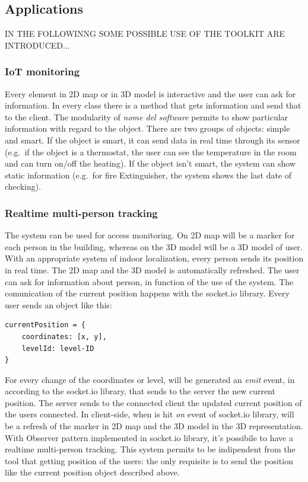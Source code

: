 \documentclass{sig-alternate}
\begin{document}
\subsection{Applications}\label{applications}

IN THE FOLLOWINNG SOME POSSIBLE USE OF THE TOOLKIT ARE INTRODUCED...

\subsubsection{IoT monitoring}\label{iot-monitoring}

Every element in 2D map or in 3D model is interactive and the user can ask for information. In every class there is a method that gets information and send that to the client. The modularity of \emph{nome del software} permits to show particular information with regard to the object. There are two groups of objects: simple and smart. If the object is smart, it can send data in real time through its sensor (e.g.~if the object is a thermostat, the user can see the temperature in the room and can turn on/off the heating). If the object isn't smart, the system can show static information (e.g.~for fire Extinguisher, the system shows the last date of checking).

\subsubsection{Realtime multi-person tracking}\label{realtime-multi-person-tracking}

The system can be used for access monitoring. On 2D map will be a marker for each person in the building, whereas on the 3D model will be a 3D model of user. With an appropriate system of indoor localization, every person sends its position in real time. The 2D map and the 3D model is automatically refreshed. The user can ask for information about person, in function of the use of the system. The comunication of the current position happens with the socket.io library. Every user sends an object like this:

\begin{verbatim}
currentPosition = {
    coordinates: [x, y],
    levelId: level-ID  
}
\end{verbatim}

For every change of the coordinates or level, will be generated an \emph{emit} event, in according to the socket.io library, that sends to the server the new current position. The server sends to the connected client the updated current position of the users connected. In client-side, when is hit \emph{on} event of socket.io library, will be a refresh of the marker in 2D map and the 3D model in the 3D representation. With Observer pattern implemented in socket.io library, it's possibile to have a realtime multi-person tracking. This system permits to be indipendent from the tool that getting position of the users: the only requisite is to send the position like the current position object described above.
\end{document}
